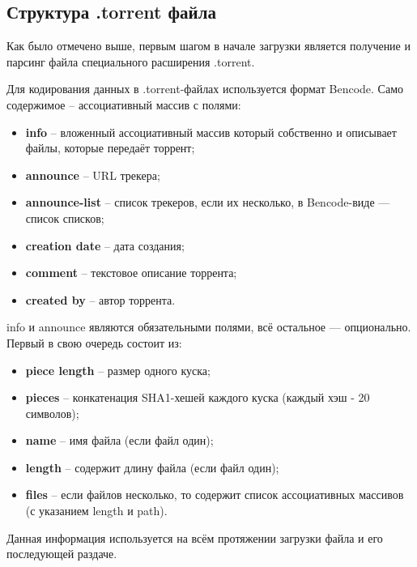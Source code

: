 \subsection{Структура .torrent файла}
Как было отмечено выше, первым шагом в начале загрузки является получение и парсинг файла специального расширения .torrent.

Для кодирования данных в .torrent-файлах используется формат Bencode. Само содержимое -- ассоциативный массив с полями:
\begin{itemize}
	\item \textbf{info} -- вложенный ассоциативный массив который собственно и описывает файлы, которые передаёт торрент;
	
	\item \textbf{announce} -- URL трекера;
	
	\item \textbf{announce-list} -- список трекеров, если их несколько, в Bencode-виде — список списков;
	
	\item \textbf{creation date} -- дата создания;
	
	\item \textbf{comment} -- текстовое описание торрента;
	
	\item \textbf{created by} -- автор торрента. \\
\end{itemize}

info и announce являются обязательными полями, всё остальное — опционально. Первый в свою очередь состоит из:
\begin{itemize}
	\item \textbf{piece length} -- размер одного куска;
	
	\item \textbf{pieces} -- конкатенация SHA1-хешей каждого куска (каждый хэш - 20 символов);
	
	\item \textbf{name} -- имя файла (если файл один);
	
	\item \textbf{length} -- содержит длину файла (если файл один);
	
	\item \textbf{files} -- если файлов несколько, то содержит список ассоциативных массивов (с указанием length и path). \\
\end{itemize}

Данная информация используется на всём протяжении загрузки файла и его последующей раздаче. \newline

